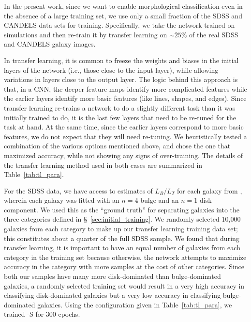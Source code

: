In the present work, since we want to enable morphological classification even in the absence of a large training set, we use only a small fraction of the SDSS and CANDELS data sets for training. Specifically, we take the network trained on simulations and then re-train it by transfer learning on $\sim25\%$ of the real SDSS and CANDELS galaxy images.

In transfer learning, it is common to freeze the weights and biases in the initial layers of the network (i.e., those close to the input layer), while allowing variations in layers close to the output layer. The logic behind this approach is that, in a CNN, the deeper feature maps identify more complicated features while the earlier layers identify more basic features (like lines, shapes, and edges). Since transfer learning re-trains a network to do a slightly different task than it was initially trained to do, it is the last few layers that need to be re-tuned for the task at hand. At the same time, since the earlier layers correspond to more basic features, we do not expect that they will need re-tuning. We heuristically tested a combination of the various options mentioned above, and chose the one that maximized accuracy, while not showing any signs of over-training. The details of the transfer learning method used in both cases are summarized in Table~\ref{tab:tl_para}.

For the SDSS data, we have access to estimates of $L_B/L_T$ for each galaxy from \citet{simard_11}, wherein each galaxy was fitted with an $n=4$ bulge and an $n=1$ disk component. We used this as the ``ground truth'' for separating galaxies into the three categories defined in \S~\ref{sec:initial_training}. We randomly selected 10,000 galaxies from each category to make up our transfer learning training data set; this constitutes about a quarter of the full SDSS sample. We found that during transfer learning, it is important to have an equal number of galaxies from each category in the training set because otherwise, the network attempts to maximize accuracy in the category with more samples at the cost of other categories. Since both our samples have many more disk-dominated than bulge-dominated galaxies, a randomly selected training set would result in a very high accuracy in classifying disk-dominated galaxies but a very low accuracy in classifying bulge-dominated galaxies. Using the configuration given in Table~\ref{tab:tl_para}, we trained \gamornet{}-S for 300 epochs.

